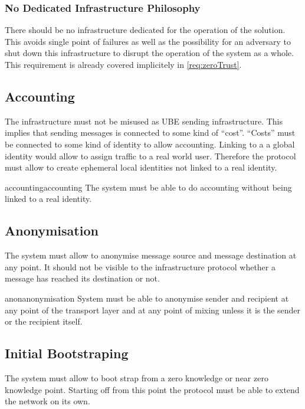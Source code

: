 \subsubsection{No Dedicated Infrastructure Philosophy}
There should be no infrastructure dedicated for the operation of the solution. This avoids single point of failures as well as the possibility for an adversary to shut down this infrastructure to disrupt the operation of the system as a whole. This requirement is already covered implicitely in \ref{req:zeroTrust}.

\subsection{Accounting}
The infrastructure must not be misused as UBE sending infrastructure. This implies that sending messages is connected to some kind of ``cost''. ``Costs'' must be connected to some kind of identity to allow accounting. Linking to a a global identity would allow to assign traffic to a real world user. Therefore the protocol must allow to create ephemeral local identities not linked to a real identity.

\begin{requirement}{accounting}{accounting}
	The system must be able to do accounting without being linked to a real identity.
\end{requirement}

\subsection{Anonymisation}
The system must allow to anonymise message source and message destination at any point. It should not be visible to the infrastructure protocol whether a message has reached its destination or not. 

\begin{requirement}{anon}{anonymisation}
	System must be able to anonymise sender and recipient at any point of the transport layer and at any point of mixing unless it is the sender or the recipient itself.
\end{requirement}

\subsection{Initial Bootstraping}
The system must allow to boot strap from a zero knowledge or near zero knowledge point. Starting off from this point the protocol must be able to extend the network on its own.

